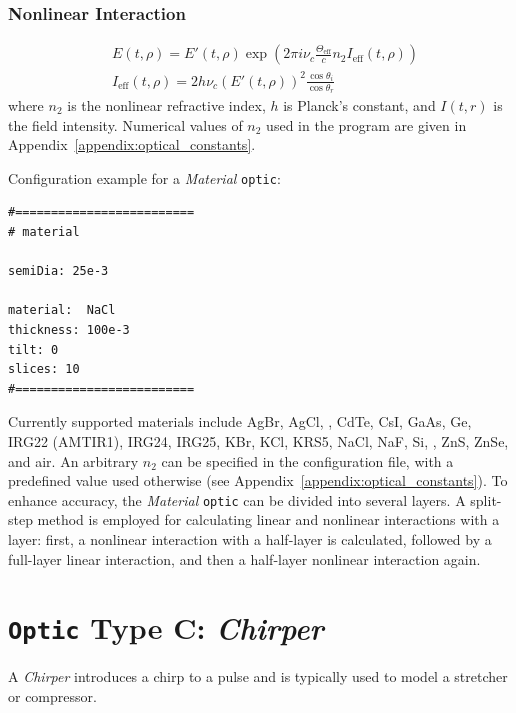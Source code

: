 \subsubsection{Nonlinear Interaction}
\begin{equation}
 \begin{aligned}
  &E(t,\rho) = E'(t,\rho) \exp\left(2\pi i \nu_c \frac{\Theta_{\text{eff}}}{c} n_2 I_{\text{eff}}(t,\rho)\right)\\
  &I_{\text{eff}}(t,\rho) = 2 h \nu_c (E'(t,\rho))^2 \frac{\cos\theta_i} {\cos\theta_r}
 \end{aligned}
\end{equation}
where \(n_2\) is the nonlinear refractive index, \(h\) is Planck's constant, and \(I(t,r)\) is the field intensity. Numerical values of \(n_2\) used in the program are given in Appendix~\ref{appendix:optical_constants}.

Configuration example for a \textit{Material} \texttt{optic}:

\begin{verbatim}
#=========================
# material

semiDia: 25e-3

material:  NaCl
thickness: 100e-3
tilt: 0
slices: 10
#=========================
\end{verbatim}

Currently supported materials include AgBr, AgCl, , CdTe, CsI, GaAs, Ge, IRG22 (AMTIR1), IRG24, IRG25, KBr, KCl, KRS5, NaCl, NaF, Si, , ZnS, ZnSe, and air. An arbitrary \(n_2\) can be specified in the configuration file, with a predefined value used otherwise (see Appendix~\ref{appendix:optical_constants}). To enhance accuracy, the \textit{Material} \texttt{optic} can be divided into several layers. A split-step method is employed for calculating linear and nonlinear interactions with a layer: first, a nonlinear interaction with a half-layer is calculated, followed by a full-layer linear interaction, and then a half-layer nonlinear interaction again.



\section{\texttt{Optic} Type C: \textit{Chirper}}
A \textit{Chirper} introduces a chirp to a pulse and is typically used to model a stretcher or compressor.

